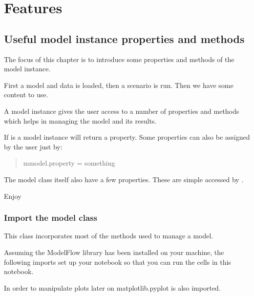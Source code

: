 \documentclass[letterpaper,10pt,english]{jupyterBook}
\begin{document}
\part{Features}

\sphinxstepscope


\chapter{Useful model instance properties and methods}
\label{\detokenize{content/notebooks/modelflow_features:useful-model-instance-properties-and-methods}}\label{\detokenize{content/notebooks/modelflow_features::doc}}
\sphinxAtStartPar
The focus of this chapter is to introduce some properties and methods of the model instance.

\sphinxAtStartPar
First a model and data is loaded, then a scenario is run. Then we have some content to use.

\sphinxAtStartPar
A model instance gives the user access to a number of properties and methods which helps in managing the model and its results.

\sphinxAtStartPar
If  is a model instance  will return a property. Some properties can also be assigned by the user just by:
\begin{quote}

\sphinxAtStartPar
mmodel.property = something
\end{quote}

\sphinxAtStartPar
The model class itself also have a few properties. These are simple accessed by  .

\sphinxAtStartPar
Enjoy


\section{Import the model class}
\label{\detokenize{content/notebooks/modelflow_features:import-the-model-class}}
\sphinxAtStartPar
This class incorporates most of the methods used to manage a model.

\sphinxAtStartPar
Assuming the ModelFlow library has been installed on your machine, the following imports set up your notebook so that you can run the cells in this notebook.

\sphinxAtStartPar
In order to manipulate plots later on matplotlib.pyplot is also imported.
\end{document}
